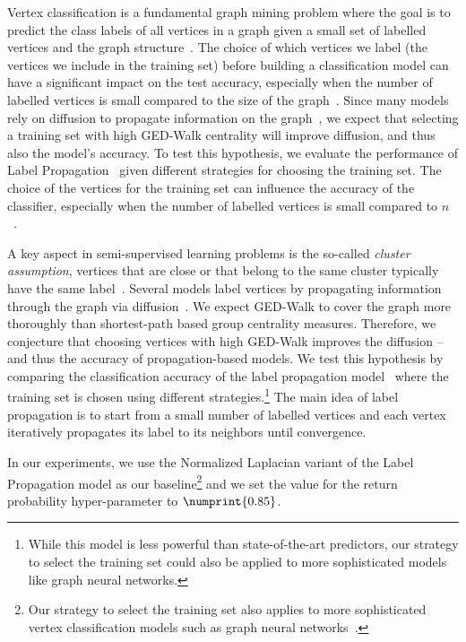 Vertex classification is a fundamental graph
mining problem where the goal is to predict the class labels of all vertices in
a graph given a small set of labelled vertices and the graph
structure~\cite{DBLP:journals/tnn/ChapelleSZ09}. The choice of which vertices
we label (\ie the vertices we include in the training set) before building a
classification model can have a significant impact on the test accuracy,
especially when the number of labelled vertices is small compared to the size
of the
graph~\cite{DBLP:conf/waw/AvrachenkovGS13,DBLP:journals/corr/abs-1811-05868}.
Since many models rely on diffusion to propagate information on the
graph~\cite{DBLP:journals/tnn/ChapelleSZ09}, we expect that selecting a
training set with high GED-Walk centrality will improve diffusion, and thus
also the model's accuracy. To test this hypothesis, we evaluate the performance
of Label Propagation~\cite{chapelle2009semi,DBLP:conf/nips/ZhouBLWS03} given
different strategies for choosing the training set.
The choice of the vertices for the training set can influence the
accuracy of the classifier, especially when the number of labelled
vertices is small compared to
$n$~\cite{DBLP:conf/waw/AvrachenkovGS13,DBLP:journals/corr/abs-1811-05868}.

A key aspect in semi-supervised learning problems is the so-called
\emph{cluster assumption}, \ie vertices that are close or that belong
to the same cluster typically have the same
label~\cite{DBLP:conf/nips/ChapelleWS02,DBLP:conf/nips/ZhouBLWS03}.
Several models label vertices by propagating information through
the graph via diffusion~\cite{DBLP:journals/tnn/ChapelleSZ09}.
We expect GED-Walk to cover the graph more thoroughly
than shortest-path based group centrality measures. Therefore, we conjecture
that choosing vertices with high GED-Walk improves the
diffusion -- and thus the accuracy of propagation-based models. We test this
hypothesis by comparing the classification accuracy of the label propagation
model~\cite{DBLP:journals/tnn/ChapelleSZ09,DBLP:conf/nips/ZhouBLWS03}
where the training set is chosen using different strategies.\footnote{While
this model is less powerful than state-of-the-art predictors,
our strategy to select the training set could also be applied to more
sophisticated models like graph neural networks.}
The main idea of label propagation is to start from a small number of
labelled vertices and each vertex iteratively propagates its label to
its neighbors until convergence.

In our experiments, we use the Normalized
Laplacian variant of the Label Propagation model as our baseline\footnote{Our
strategy to select the training set also applies to more sophisticated vertex
classification models such as graph neural
networks~\cite{DBLP:conf/iclr/KipfW17}.} and we set the value for the return
probability hyper-parameter to $\numprint{0.85}$.

